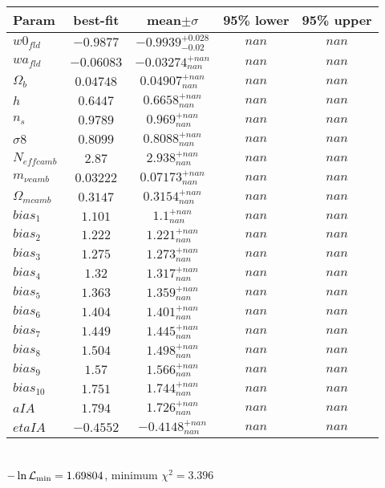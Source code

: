 \begin{tabular}{|l|c|c|c|c|} 
 \hline 
Param & best-fit & mean$\pm\sigma$ & 95\% lower & 95\% upper \\ \hline 
$w0_{fld }$ &$-0.9877$ & $-0.9939_{-0.02}^{+0.028}$ & $nan$ & $nan$ \\ 
$wa_{fld }$ &$-0.06083$ & $-0.03274_{nan}^{+nan}$ & $nan$ & $nan$ \\ 
$\Omega_{b }$ &$0.04748$ & $0.04907_{nan}^{+nan}$ & $nan$ & $nan$ \\ 
$h$ &$0.6447$ & $0.6658_{nan}^{+nan}$ & $nan$ & $nan$ \\ 
$n_{s }$ &$0.9789$ & $0.969_{nan}^{+nan}$ & $nan$ & $nan$ \\ 
$\sigma8$ &$0.8099$ & $0.8088_{nan}^{+nan}$ & $nan$ & $nan$ \\ 
$N_{eff camb }$ &$2.87$ & $2.938_{nan}^{+nan}$ & $nan$ & $nan$ \\ 
$m_{\nu camb }$ &$0.03222$ & $0.07173_{nan}^{+nan}$ & $nan$ & $nan$ \\ 
$\Omega_{m camb }$ &$0.3147$ & $0.3154_{nan}^{+nan}$ & $nan$ & $nan$ \\ 
$bias_{1 }$ &$1.101$ & $1.1_{nan}^{+nan}$ & $nan$ & $nan$ \\ 
$bias_{2 }$ &$1.222$ & $1.221_{nan}^{+nan}$ & $nan$ & $nan$ \\ 
$bias_{3 }$ &$1.275$ & $1.273_{nan}^{+nan}$ & $nan$ & $nan$ \\ 
$bias_{4 }$ &$1.32$ & $1.317_{nan}^{+nan}$ & $nan$ & $nan$ \\ 
$bias_{5 }$ &$1.363$ & $1.359_{nan}^{+nan}$ & $nan$ & $nan$ \\ 
$bias_{6 }$ &$1.404$ & $1.401_{nan}^{+nan}$ & $nan$ & $nan$ \\ 
$bias_{7 }$ &$1.449$ & $1.445_{nan}^{+nan}$ & $nan$ & $nan$ \\ 
$bias_{8 }$ &$1.504$ & $1.498_{nan}^{+nan}$ & $nan$ & $nan$ \\ 
$bias_{9 }$ &$1.57$ & $1.566_{nan}^{+nan}$ & $nan$ & $nan$ \\ 
$bias_{10 }$ &$1.751$ & $1.744_{nan}^{+nan}$ & $nan$ & $nan$ \\ 
$aIA$ &$1.794$ & $1.726_{nan}^{+nan}$ & $nan$ & $nan$ \\ 
$etaIA$ &$-0.4552$ & $-0.4148_{nan}^{+nan}$ & $nan$ & $nan$ \\ 
\hline 
 \end{tabular} \\ 
$-\ln{\cal L}_\mathrm{min} =1.69804$, minimum $\chi^2=3.396$ \\ 
